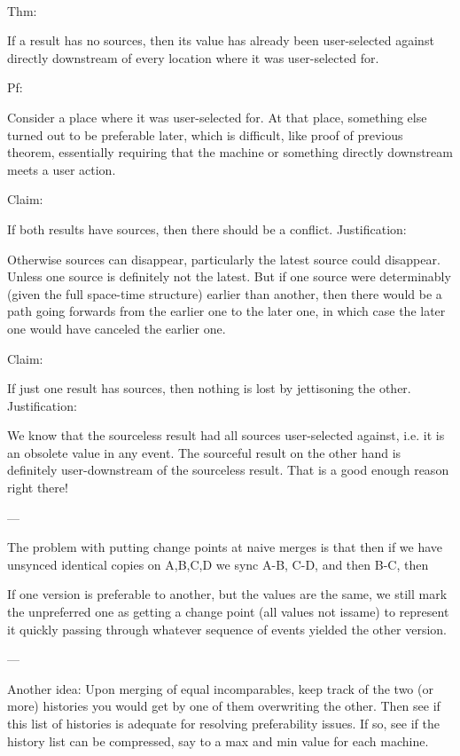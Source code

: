 \documentclass{book}
\begin{document}
~

Thm:

If a result has no sources, then its value has already been user-selected against directly downstream of every location where it was user-selected for.

Pf:

Consider a place where it was user-selected for.  At that place, something else turned out to be preferable later, which is difficult, like proof of previous theorem, essentially requiring that the machine or something directly downstream meets a user action.

Claim:

If both results have sources, then there should be a conflict.
Justification:

Otherwise sources can disappear, particularly the latest source could disappear.  Unless one source is definitely not the latest.  But if one source were determinably (given the full space-time structure) earlier than another, then there would be a path going forwards from the earlier one to the later one, in which case the later one would have canceled the earlier one.

Claim:

If just one result has sources, then nothing is lost by jettisoning the other.
Justification:

We know that the sourceless result had all sources user-selected against, i.e. it is an obsolete value in any event.  The sourceful result on the other hand is definitely user-downstream of the sourceless result.  That is a good enough reason right there!

---

The problem with putting change points at naive merges is that then if we have unsynced identical copies on A,B,C,D we sync A-B, C-D, and then B-C, then

If one version is preferable to another, but the values are the same, we still mark the unpreferred one as getting a change point (all values not issame) to represent it quickly passing through whatever sequence of events yielded the other version.

---

Another idea:  Upon merging of equal incomparables, keep track of the two (or more) histories you would get by one of them overwriting the other.  Then see if this list of histories is adequate for resolving preferability issues.  If so, see if the history list can be compressed, say to a max and min value for each machine.
\end{document}
